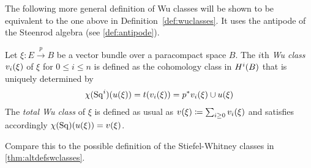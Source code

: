 The following more general definition of Wu classes
will be shown to be equivalent to the one above in
Definition~\autoref{def:wuclasses}.
It uses the antipode of the Steenrod algebra (see \autoref{def:antipode}). 
\begin{Def}\label{def:altwuclasses}
  Let $\xi\colon E\xrightarrow{p} B$ be a vector bundle over a
  paracompact space $B$.
  The $i$th \emph{Wu class} ${v_{i}}(\xi)$ of $\xi$ for $0\leq i\leq n$
  is defined as the cohomology class in $H^i(B)$ that is uniquely
  determined by
  \begin{gather*}
    \chi(\mathrm{Sq}^{i})({u}(\xi)) = t({v_{i}}(\xi)) = {p}^* {v_{i}}(\xi) \cup {u}(\xi)
  \end{gather*}
  The \emph{total Wu class} of $\xi$ is defined as usual as
  ${v_{}}(\xi)\coloneqq\sum_{i\geq0}{v_{i}}(\xi)$ and satisfies accordingly 
  $\chi(\mathrm{Sq})({u}(\xi))={v_{}}(\xi)$.
\end{Def}
\begin{Rem}
  Compare this to the possible definition of the Stiefel-Whitney
  classes in \autoref{thm:altdefswclasses}.
\end{Rem}

